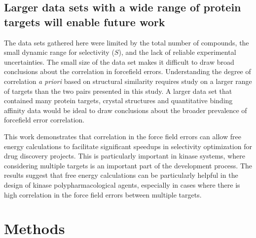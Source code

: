 \documentclass[phd,tocprelim]{cornell}
\begin{document}
\subsection{Larger data sets with a wide range of protein targets will enable future work}

The data sets gathered here were limited by the total number of compounds, the small dynamic range for selectivity ($S$), and the lack of reliable experimental uncertainties. The small size of the data set makes it difficult to draw broad conclusions about the correlation in forcefield errors. Understanding the degree of correlation \emph{a priori} based on structural similarity requires study on a larger range of targets than the two pairs presented in this study. A larger data set that contained many protein targets, crystal structures and quantitative binding affinity data would be ideal to draw conclusions about the broader prevalence of forcefield error correlation. 

This work demonstrates that correlation in the force field errors can allow free energy calculations to facilitate significant speedups in selectivity optimization for drug discovery projects. This is particularly important in kinase systems, where considering multiple targets is an important part of the development process. The results suggest that free energy calculations can be particularly helpful in the design of kinase polypharmacological agents, especially in cases where there is high correlation in the force field errors between multiple targets. 



\section{Methods}
\end{document}
